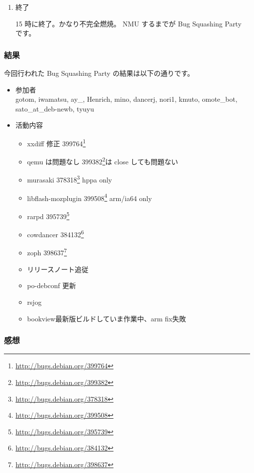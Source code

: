 \documentclass[mingoth,a4paper]{jsarticle}
\newcommand{\debianbug}[1]{#1\footnote{\url{http://bugs.debian.org/#1}}}
\begin{document}
\begin{enumerate}
\begin{itemize}
	\url{http://bugs.debian.org/release-critical/}
  \item 現在の RC バグ情報 
	
	\url{http://bugs.debian.org/release-critical/debian/all.html}
  \item リリースチームが使っている RC バグ管理サイト 
	
\url{http://bts.turmzimmer.net/details.php}
 \end{itemize}
\item 終了

 15 時に終了。かなり不完全燃焼。
 NMU するまでが Bug Squashing Party です。

\end{enumerate}

\subsubsection{結果}
 今回行われた Bug Squashing Party の結果は以下の通りです。

\begin{itemize}
 \item 参加者\\
 gotom,
 iwamatsu,
 ay\_,
 Henrich,
 mino,
 dancerj,
 nori1,
 kmuto,
 omote\_bot,
 sato\_at\_deb-newb,
 tyuyu

 \item 活動内容
   \begin{itemize}
   \item xxdiff 修正 \debianbug{399764}
   \item qemu は問題なし \debianbug{399382}は close しても問題ない
   \item murasaki \debianbug{378318} hppa only
   \item libflash-mozplugin \debianbug{399508} arm/ia64 only
   \item rarpd \debianbug{395739}
   \item cowdancer \debianbug{384132}
   \item zoph \debianbug{398637}
   \item リリースノート追従
   \item po-debconf 更新
   \item rsjog
   \item bookview最新版ビルドしていま作業中、arm fix失敗
   \end{itemize}
\end{itemize}

\subsubsection{感想}
\end{document}
